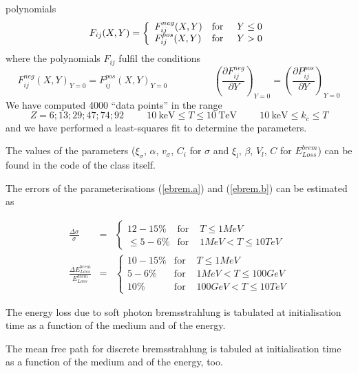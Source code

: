 polynomials
\[
F_{ij}(X,Y) = \left \{
\begin{array}{ll}
F_{ij}^{neg}(X,Y) & \mbox{for\hspace{0.5cm}} Y\leq 0 \\
F_{ij}^{pos}(X,Y) & \mbox{for\hspace{0.5cm}} Y>0
\end{array} \right .
\]
where the polynomials $F_{ij}$ fulfil the conditions
\[
F_{ij}^{neg}(X,Y)_{Y=0} = F_{ij}^{pos}(X,Y)_{Y=0}   \hspace{2cm}
\left ( \frac{\partial F_{ij}^{neg}}{\partial Y} \right )_{Y=0} =
\left ( \frac{\partial P_{ij}^{pos}}{\partial Y} \right )_{Y=0}
\]
We have computed 4000 ``data points'' in the range
\[
Z = 6  ;  13  ;  29  ;  47  ;  74  ;  92  \hspace{1cm}
10 \: \mbox{keV} \leq T \leq 10 \: \mbox{TeV}  \hspace{1cm}
10 \: \mbox{keV} \leq k_c \leq T
\]
and we have performed a least-squares fit to determine the parameters.

The values of the parameters ($\xi_{\sigma}$, $\alpha$,
$v_{\sigma}$, $C_i $ for $\sigma$ and
$\xi_l$, $\beta$, $V_l$, $C$ for $E_{Loss}^{brem}$)
can be found in the code of the class itself.

The errors of the parameterisations (\ref{ebrem.a}) and (\ref{ebrem.b})
can be estimated as

\begin{eqnarray*}
\frac{\Delta\sigma} {\sigma} & = & \left \{
\begin{array}{llr}
        12-15\%    & \mbox{for    } & T \leq 1 MeV \\
        \leq 5-6\% & \mbox{for    } & 1 MeV < T \leq 10 TeV
\end{array}
\right . \\[1cm]
\frac{\Delta E_{Loss}^{brem}}
     {E_{Loss}^{brem}} & = & \left \{
\begin{array}{llr}
        10-15\%    & \mbox{for    } & T \leq1 MeV  \\
        5-6\%      & \mbox{for    } & 1 MeV < T \leq 100 GeV\\
        10\%       & \mbox{for    } & 100 GeV < T \leq10 TeV
\end{array}
\right .
\end{eqnarray*}


The energy loss due to soft photon bremsstrahlung is tabulated at
initialisation time as a function of the medium and of the energy.  

The mean free path for discrete bremsstrahlung is tabuled at initialisation
time as a function
of the medium and of the energy, too.  

